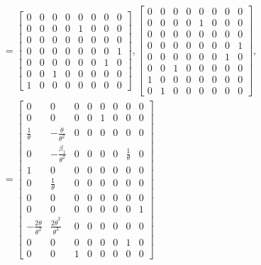 \documentclass[12pt]{article}
\begin{document}
\begin{align*}
    &=
    \left[\begin{matrix}0 & 0 & 0 & 0 & 0 & 0 & 0 & 0\\0 & 0 & 0 & 0 & 1 & 0 & 0 & 0\\0 & 0 & 0 & 0 & 0 & 0 & 0 & 0\\0 & 0 & 0 & 0 & 0 & 0 & 0 & 1\\0 & 0 & 0 & 0 & 0 & 0 & 1 & 0\\0 & 0 & 1 & 0 & 0 & 0 & 0 & 0\\1 & 0 & 0 & 0 & 0 & 0 & 0 & 0\end{matrix}\right], 
    \left[\begin{matrix}0 & 0 & 0 & 0 & 0 & 0 & 0 & 0\\0 & 0 & 0 & 0 & 1 & 0 & 0 & 0\\0 & 0 & 0 & 0 & 0 & 0 & 0 & 0\\0 & 0 & 0 & 0 & 0 & 0 & 0 & 1\\0 & 0 & 0 & 0 & 0 & 0 & 1 & 0\\0 & 0 & 1 & 0 & 0 & 0 & 0 & 0\\1 & 0 & 0 & 0 & 0 & 0 & 0 & 0\\0 & 1 & 0 & 0 & 0 & 0 & 0 & 0\end{matrix}\right], \\
    &=
    \left[\begin{matrix}0 & 0 & 0 & 0 & 0 & 0 & 0 & 0\\0 & 0 & 0 & 0 & 1 & 0 & 0 & 0\\\frac{1}{\theta} & - \frac{\dot{\theta}}{\theta^{2}} & 0 & 0 & 0 & 0 & 0 & 0\\0 & - \frac{\beta_{1}}{\theta^{2}} & 0 & 0 & 0 & 0 & \frac{1}{\theta} & 0\\1 & 0 & 0 & 0 & 0 & 0 & 0 & 0\\0 & \frac{1}{\theta} & 0 & 0 & 0 & 0 & 0 & 0\\0 & 0 & 0 & 0 & 0 & 0 & 0 & 0\\0 & 0 & 0 & 0 & 0 & 0 & 0 & 1\\- \frac{2 \dot{\theta}}{\theta^{2}} & \frac{2 \dot{\theta}^{2}}{\theta^{3}} & 0 & 0 & 0 & 0 & 0 & 0\\0 & 0 & 0 & 0 & 0 & 0 & 1 & 0\\0 & 0 & 1 & 0 & 0 & 0 & 0 & 0\end{matrix}\right]
\end{align*}
\end{document}
